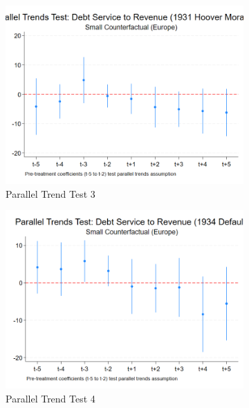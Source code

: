 \begin{figure}[ht!]
    \begin{subfigure}[b]{0.48\textwidth}
        \centering
        \includegraphics[width=\textwidth]{figures/PT_DebtServ_1931_Small.png}
        \caption{Parallel Trend Test 3}
        \label{fig:pt3}
    \end{subfigure}
    \hfill
    \begin{subfigure}[b]{0.48\textwidth}
        \centering
        \includegraphics[width=\textwidth]{figures/PT_DebtServ_1934_Small.png}
        \caption{Parallel Trend Test 4}
        \label{fig:pt4}
    \end{subfigure}
    \\[1em]
    \begin{subfigure}[b]{0.48\textwidth}

\end{subfigure}
\end{figure}

